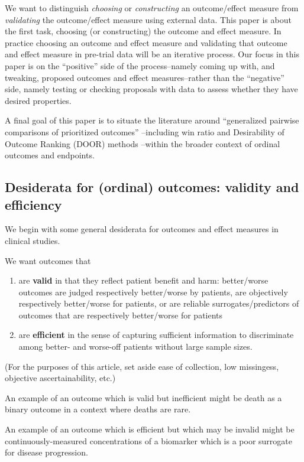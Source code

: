 \documentclass[
  11pt,
  fleqn
]{article}
\begin{document}
We want to distinguish \emph{choosing} or \emph{constructing} an outcome/effect
measure from \emph{validating} the outcome/effect measure using external data.
This paper is about the first task, choosing (or constructing) the outcome and
effect measure. In practice choosing an outcome and effect measure and
validating that outcome and effect measure in pre-trial data will be an
iterative process. Our focus in this paper is on the ``positive'' side of the
process--namely coming up with, and tweaking, proposed outcomes and effect
measures--rather than the ``negative'' side, namely testing or checking
proposals with data to assess whether they have desired properties.

A final goal of this paper is to situate the literature around ``generalized
pairwise comparisons of prioritized outcomes''
\citep{buyseGeneralizedPairwiseComparisons2022}--including win ratio
\citep{pocockWinRatioNew2012} and Desirability of Outcome Ranking (DOOR)
methods \citep{evansDesirabilityOutcomeRanking2015,
ongUnlockingDOORHow2023}--within the broader context of ordinal outcomes and
endpoints.

\subsection{Desiderata for (ordinal) outcomes: validity and efficiency}

We begin with some general desiderata for outcomes and effect measures in
clinical studies.

We want outcomes that
\begin{enumerate}
  \item are \textbf{valid} in that they reflect patient benefit and harm:
    better/worse outcomes are judged respectively better/worse by patients, are
    objectively respectively better/worse for patients, or are reliable
    surrogates/predictors of outcomes that are respectively better/worse for
    patients
  \item are \textbf{efficient} in the sense of capturing
    sufficient information to
    discriminate among better- and worse-off patients without large
    sample sizes.
\end{enumerate}
(For the purposes of this article, set aside ease of collection, low
missingess, objective ascertainability, etc.)

An example of an outcome which is valid but inefficient might be
death as a binary outcome in a context where deaths
are rare.

An example of an outcome which is efficient but which may be invalid
might be continuously-measured concentrations of a biomarker which is a poor
surrogate for disease progression.
\end{document}
